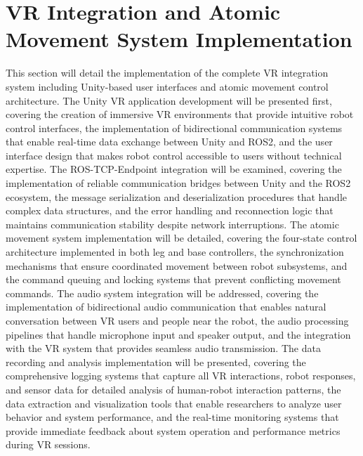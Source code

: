 \section{VR Integration and Atomic Movement System Implementation}
This section will detail the implementation of the complete VR integration system including Unity-based user interfaces and atomic movement control architecture. The Unity VR application development will be presented first, covering the creation of immersive VR environments that provide intuitive robot control interfaces, the implementation of bidirectional communication systems that enable real-time data exchange between Unity and ROS2, and the user interface design that makes robot control accessible to users without technical expertise. The ROS-TCP-Endpoint integration will be examined, covering the implementation of reliable communication bridges between Unity and the ROS2 ecosystem, the message serialization and deserialization procedures that handle complex data structures, and the error handling and reconnection logic that maintains communication stability despite network interruptions. The atomic movement system implementation will be detailed, covering the four-state control architecture implemented in both leg and base controllers, the synchronization mechanisms that ensure coordinated movement between robot subsystems, and the command queuing and locking systems that prevent conflicting movement commands. The audio system integration will be addressed, covering the implementation of bidirectional audio communication that enables natural conversation between VR users and people near the robot, the audio processing pipelines that handle microphone input and speaker output, and the integration with the VR system that provides seamless audio transmission. The data recording and analysis implementation will be presented, covering the comprehensive logging systems that capture all VR interactions, robot responses, and sensor data for detailed analysis of human-robot interaction patterns, the data extraction and visualization tools that enable researchers to analyze user behavior and system performance, and the real-time monitoring systems that provide immediate feedback about system operation and performance metrics during VR sessions.

